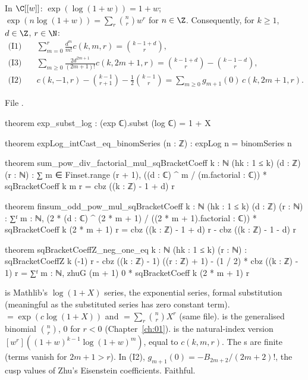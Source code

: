 \begin{theorem}\label{l14:thm:explog}
In $\C[[w]]$: $\exp(\log(1+w)) = 1+w$; $\exp(n\log(1+w)) = \sum_r\binom nrw^r$ for $n\in\Z$. Consequently, for $k\ge1$,
$d\in\Z$, $r\in\N$:
\begin{align*}
 \text{(I1)}\quad&\sum_{m=0}^{r}\frac{d^m}{m!}c(k,m,r) = \binom{k-1+d}{r},\\
 \text{(I3)}\quad&\sum_{m\ge0}\frac{2d^{2m+1}}{(2m+1)!}c(k,2m+1,r) = \binom{k-1+d}{r} - \binom{k-1-d}{r},\\
 \text{(I2)}\quad&c(k,-1,r) - \binom{k-1}{r+1} - \tfrac12\binom{k-1}{r} = \sum_{m\ge0}g_{m+1}(0)\,c(k,2m+1,r).
\end{align*}
\end{theorem}
\noindent File .
\begin{leancode}
theorem exp_subst_log : (exp ℂ).subst (log ℂ) = 1 + X

theorem expLog_intCast_eq_binomSeries (n : ℤ) : expLog n = binomSeries n

theorem sum_pow_div_factorial_mul_sqBracketCoeff {k : ℕ} (hk : 1 ≤ k) (d : ℤ) (r : ℕ) :
    ∑ m ∈ Finset.range (r + 1), ((d : ℂ) ^ m / (m.factorial : ℂ)) * sqBracketCoeff k m r
      = cbz ((k : ℤ) - 1 + d) r

theorem finsum_odd_pow_mul_sqBracketCoeff {k : ℕ} (hk : 1 ≤ k) (d : ℤ) (r : ℕ) :
    ∑ᶠ m : ℕ, (2 * (d : ℂ) ^ (2 * m + 1) / ((2 * m + 1).factorial : ℂ))
        * sqBracketCoeff k (2 * m + 1) r
      = cbz ((k : ℤ) - 1 + d) r - cbz ((k : ℤ) - 1 - d) r

theorem sqBracketCoeffZ_neg_one_eq {k : ℕ} (hk : 1 ≤ k) (r : ℕ) :
    sqBracketCoeffZ k (-1) r - cbz ((k : ℤ) - 1) ((r : ℤ) + 1) - (1 / 2) * cbz ((k : ℤ) - 1) r
      = ∑ᶠ m : ℕ, zhuG (m + 1) 0 * sqBracketCoeff k (2 * m + 1) r
\end{leancode}
\begin{dictionary}
 is Mathlib's $\log(1+X)$ series,  the exponential series,  formal substitution
(meaningful as the substituted series has zero constant term).  $=\exp(c\log(1+X))$ and 
$=\sum_r\binom nrX^r$ (same file).  is the generalised binomial $\binom nr$, $0$ for $r<0$ (Chapter~\ref{ch:01}).
 is the natural-index version $[w^r]((1+w)^{k-1}\log(1+w)^m)$, equal to $c(k,m,r)$. The
s are finite (terms vanish for $2m+1>r$). In (I2), $g_{m+1}(0) = -B_{2m+2}/(2m+2)!$, the cusp values of Zhu's
Eisenstein coefficients. Faithful.
\end{dictionary}
